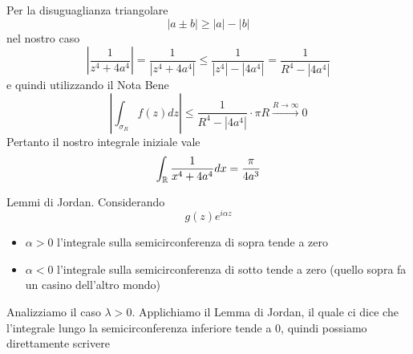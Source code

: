 Per la disuguaglianza triangolare
\begin{equation*}
\left| a\pm b\right| \geq \left| a\right| - \left| b\right| 
\end{equation*}
nel nostro caso
\begin{equation*}
\left| \frac{1}{z^{4} + 4a^{4}}\right| = \frac{1}{\left| z^{4} + 4a^{4}\right| } \leq \frac{1}{\left| z^{4}\right| - \left| 4a^{4}\right| } = \frac{1}{R^{4} - \left| 4a^{4}\right| }
\end{equation*}
e quindi utilizzando il Nota Bene
\begin{equation*}
\left| \int _{\sigma _{R}} f\left(z\right) dz\right| \leq \frac{1}{R^{4} - \left| 4a^{4}\right| } \cdot \pi R\xrightarrow{R\rightarrow \infty } 0
\end{equation*}
Pertanto il nostro integrale iniziale vale
\begin{equation*}
\int _{\mathbb{R} }\frac{1}{x^{4} + 4a^{4}} dx = \frac{\pi }{4a^{3}}
\end{equation*}
\Soluzione
\begin{thm}
Lemmi di Jordan. Considerando
\begin{equation*}
g\left(z\right) e^{i\alpha z}
\end{equation*}
\begin{itemize}
\item $\alpha  > 0$ l'integrale sulla semicirconferenza di sopra tende a zero
\item $\alpha < 0$ l'integrale sulla semicirconferenza di sotto tende a zero (quello sopra fa un casino dell'altro mondo)
\end{itemize}
\end{thm}
Analizziamo il caso $\lambda  > 0$. Applichiamo il Lemma di Jordan, il quale ci dice che l'integrale lungo la semicirconferenza inferiore tende a $0$, quindi possiamo direttamente scrivere


